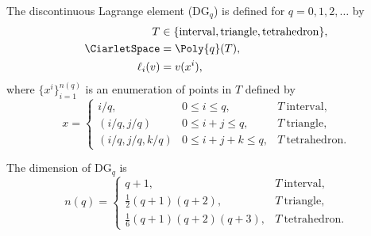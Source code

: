\begin{definition}
  The discontinuous Lagrange element ($\mathrm{DG}_q$)
  is defined for $q = 0, 1, 2, \dots$ by
  \begin{align}
    T &\in \{ \mathrm{interval}{},
              \mathrm{triangle}{},
              \mathrm{tetrahedron}{}\}, \\
    \CiarletSpace &= \Poly{q}(T), \\
    \ell_i(v) &= v(x^i),
  \end{align}
  where $\{ x^i \}_{i=1}^{n(q)}$ is an enumeration of points in
  $T$ defined by
  \begin{equation}
    x =
    \left \{
    \begin{array}{lll}
      i/q,            & 0 \leqslant i \leqslant q,         & T~\mathrm{interval}, \\
      (i/q, j/q)      & 0 \leqslant i + j \leqslant q,     & T~\mathrm{triangle}, \\
      (i/q, j/q, k/q) & 0 \leqslant i + j + k \leqslant q, & T~\mathrm{tetrahedron}.
    \end{array}
    \right.
  \end{equation}
\end{definition}
The dimension of $\mathrm{DG}_q$ is
\begin{equation}
  n(q) =
    \left \{
    \begin{array}{ll}
      q + 1, & T~\mathrm{interval}, \\
      \frac{1}{2} (q + 1)(q + 2), & T~\mathrm{triangle}, \\
      \frac{1}{6} (q + 1)(q + 2)(q + 3), & T~\mathrm{tetrahedron}.
    \end{array}
    \right.
\end{equation}

